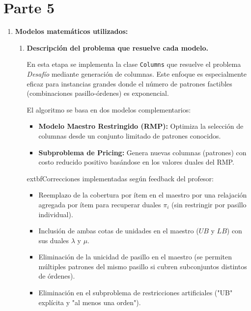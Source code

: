 \documentclass[a4paper,12pt]{article}
\begin{document}
\clearpage

\section{Parte 5}

\begin{enumerate}[label=(\alph*), leftmargin=2em]
    \item \textbf{Modelos matemáticos utilizados:}
    \begin{enumerate}[label=\roman*., leftmargin=0.2em]
    
        \item \textbf{Descripción del problema que resuelve cada modelo.}
        
            En esta etapa se implementa la clase \texttt{Columns} que resuelve el problema \textit{Desafío} mediante generación de columnas. Este enfoque es especialmente eficaz para instancias grandes donde el número de patrones factibles (combinaciones pasillo-órdenes) es exponencial.

            El algoritmo se basa en dos modelos complementarios:
            \begin{itemize}
                \item \textbf{Modelo Maestro Restringido (RMP):} Optimiza la selección de columnas desde un conjunto limitado de patrones conocidos.
                \item \textbf{Subproblema de Pricing:} Genera nuevas columnas (patrones) con costo reducido positivo basándose en los valores duales del RMP.
            \end{itemize}

            	extbf{Correcciones implementadas según feedback del profesor:}
            \begin{itemize}
                \item Reemplazo de la cobertura por ítem en el maestro por una relajación agregada por ítem para recuperar duales $\pi_i$ (sin restringir por pasillo individual).
                \item Inclusión de ambas cotas de unidades en el maestro ($UB$ y $LB$) con sus duales $\lambda$ y $\mu$.
                \item Eliminación de la unicidad de pasillo en el maestro (se permiten múltiples patrones del mismo pasillo si cubren subconjuntos distintos de órdenes).
                \item Eliminación en el subproblema de restricciones artificiales ("UB" explícita y "al menos una orden").
            \end{itemize}


\end{enumerate}
\end{enumerate}
\end{document}
